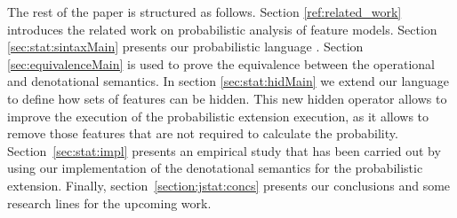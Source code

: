 The rest of the paper is structured as follows.
Section \ref{ref:related_work} introduces the related work on probabilistic analysis
of feature models.
Section \ref{sec:stat:sintaxMain} presents our probabilistic language \fodaPAp.
Section \ref{sec:equivalenceMain} is used to prove the equivalence between the operational and denotational semantics.
In section \ref{sec:stat:hidMain} we extend our language to define how sets of features can be hidden. This new
hidden operator allows to improve the execution of the probabilistic
extension execution, as it allows to remove those features that are not required to calculate the probability.
Section~\ref{sec:stat:impl} presents an empirical study that has been carried out by using our implementation of the denotational semantics for the probabilistic extension.
Finally, section~\ref{section:jstat:concs} presents our conclusions and some research lines for the upcoming work.





